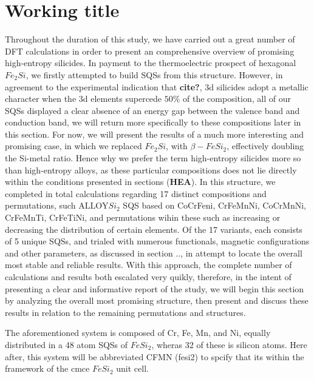 \chapter{Working title}
\label{sec:something}




Throughout the duration of this study, we have carried out a great number of DFT calculations in order to present an comprehensive overview of promising high-entropy silicides. In payment to the thermoelectric prospect of hexagonal $Fe_2Si$, we firstly attempted to build SQSs from this structure. However, in agreement to the experimental indication that \textbf{cite?}, 3d silicides adopt a metallic character when the 3d elements supercede $50\%$ of the composition, all of our SQSs displayed a clear absence of an energy gap between the valence band and conduction band, we will return  more specifically to these compositions later in this section. For now, we will present the results of a much more interesting and promising case, in which we replaced $Fe_2Si$, with $\beta-FeSi_2$, effectively doubling the Si-metal ratio. Hence why we prefer the term high-entropy silicides more so than high-entropy alloys, as these particular compositions does not lie directly within the conditions presented in sections (\textbf{HEA}). In this structure, we completed in total calculations regarding 17 distinct compositions and permutations, such $\text{ALLOY}Si_2$ SQS based on CoCrFeni, CrFeMnNi, CoCrMnNi, CrFeMnTi, CrFeTiNi, and permutations wihin these such as increasing or decreasing the distribution of certain elements. Of the 17 variants, each consists of 5 unique SQSs, and trialed with numerous functionals, magnetic configurations and other parameters, as discussed in section .., in attempt to locate the overall most stable and reliable results. With this approach, the complete number of calculations and results both escalated very quikly, therefore, in the intent of presenting a clear and informative report of the study, we will begin this section by analyzing the overall most promising structure, then present and discuss these results in relation to the remaining permutations and structures.    

The aforementioned system is composed of Cr, Fe, Mn, and Ni, equally distributed in a 48 atom SQSs of $FeSi_2$, wheras 32 of these is silicon atoms. Here after, this system will be abbreviated CFMN (fesi2) to spcify that its within the framework of the cmce $FeSi_2$ unit cell.
 
